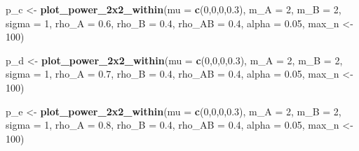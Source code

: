 \documentclass[]{article}
\newenvironment{Shaded}{\begin{snugshade}}{\end{snugshade}}
\newcommand{\KeywordTok}[1]{\textcolor[rgb]{0.13,0.29,0.53}{\textbf{#1}}}
\newcommand{\DataTypeTok}[1]{\textcolor[rgb]{0.13,0.29,0.53}{#1}}
\newcommand{\DecValTok}[1]{\textcolor[rgb]{0.00,0.00,0.81}{#1}}
\newcommand{\FloatTok}[1]{\textcolor[rgb]{0.00,0.00,0.81}{#1}}
\newcommand{\StringTok}[1]{\textcolor[rgb]{0.31,0.60,0.02}{#1}}
\newcommand{\NormalTok}[1]{#1}
\begin{document}
\begin{Shaded}
\begin{Highlighting}[]
\NormalTok{p_c <-}\StringTok{ }\KeywordTok{plot_power_2x2_within}\NormalTok{(}\DataTypeTok{mu =} \KeywordTok{c}\NormalTok{(}\DecValTok{0}\NormalTok{,}\DecValTok{0}\NormalTok{,}\DecValTok{0}\NormalTok{,}\FloatTok{0.3}\NormalTok{), }
                      \DataTypeTok{m_A =} \DecValTok{2}\NormalTok{, }
                      \DataTypeTok{m_B =} \DecValTok{2}\NormalTok{, }
                      \DataTypeTok{sigma =} \DecValTok{1}\NormalTok{, }
                      \DataTypeTok{rho_A =} \FloatTok{0.6}\NormalTok{, }
                      \DataTypeTok{rho_B =} \FloatTok{0.4}\NormalTok{, }
                      \DataTypeTok{rho_AB =} \FloatTok{0.4}\NormalTok{, }
                      \DataTypeTok{alpha =} \FloatTok{0.05}\NormalTok{,}
\NormalTok{                      max_n <-}\StringTok{ }\DecValTok{100}\NormalTok{)}

\NormalTok{p_d <-}\StringTok{ }\KeywordTok{plot_power_2x2_within}\NormalTok{(}\DataTypeTok{mu =} \KeywordTok{c}\NormalTok{(}\DecValTok{0}\NormalTok{,}\DecValTok{0}\NormalTok{,}\DecValTok{0}\NormalTok{,}\FloatTok{0.3}\NormalTok{), }
                      \DataTypeTok{m_A =} \DecValTok{2}\NormalTok{, }
                      \DataTypeTok{m_B =} \DecValTok{2}\NormalTok{, }
                      \DataTypeTok{sigma =} \DecValTok{1}\NormalTok{, }
                      \DataTypeTok{rho_A =} \FloatTok{0.7}\NormalTok{, }
                      \DataTypeTok{rho_B =} \FloatTok{0.4}\NormalTok{, }
                      \DataTypeTok{rho_AB =} \FloatTok{0.4}\NormalTok{, }
                      \DataTypeTok{alpha =} \FloatTok{0.05}\NormalTok{,}
\NormalTok{                      max_n <-}\StringTok{ }\DecValTok{100}\NormalTok{)}

\NormalTok{p_e <-}\StringTok{ }\KeywordTok{plot_power_2x2_within}\NormalTok{(}\DataTypeTok{mu =} \KeywordTok{c}\NormalTok{(}\DecValTok{0}\NormalTok{,}\DecValTok{0}\NormalTok{,}\DecValTok{0}\NormalTok{,}\FloatTok{0.3}\NormalTok{), }
                      \DataTypeTok{m_A =} \DecValTok{2}\NormalTok{, }
                      \DataTypeTok{m_B =} \DecValTok{2}\NormalTok{, }
                      \DataTypeTok{sigma =} \DecValTok{1}\NormalTok{, }
                      \DataTypeTok{rho_A =} \FloatTok{0.8}\NormalTok{, }
                      \DataTypeTok{rho_B =} \FloatTok{0.4}\NormalTok{, }
                      \DataTypeTok{rho_AB =} \FloatTok{0.4}\NormalTok{, }
                      \DataTypeTok{alpha =} \FloatTok{0.05}\NormalTok{,}
\NormalTok{                      max_n <-}\StringTok{ }\DecValTok{100}\NormalTok{)}


\end{Highlighting}
\end{Shaded}
\end{document}
